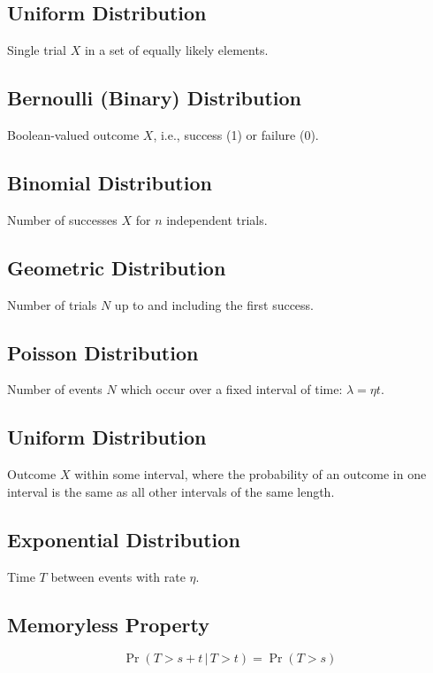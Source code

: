 \documentclass{article}
\begin{document}
\begin{multicols}{3}
    \subsection{Uniform Distribution}
    Single trial \(X\) in a set of equally likely elements.
    \subsection{Bernoulli (Binary) Distribution}
    Boolean-valued outcome \(X\), i.e., success (1) or failure (0).
    \subsection{Binomial Distribution}
    Number of successes \(X\) for \(n\) independent trials.
    \subsection{Geometric Distribution}
    Number of trials \(N\) up to and including the first success.
    \subsection{Poisson Distribution}
    Number of events \(N\) which occur over a fixed interval of time: \(\lambda = \eta t\).
    \subsection{Uniform Distribution}
    Outcome \(X\) within some interval, where the probability of an outcome in one interval is the same as all other intervals of the same length.
    \subsection{Exponential Distribution}
    Time \(T\) between events with rate \(\eta\).
    \subsection{Memoryless Property}
    \begin{equation*}
        \Pr{\left( T > s + t \,\vert\, T > t \right)} = \Pr{\left( T > s \right)}
    \end{equation*}
    \endgroup
\end{multicols}
\end{document}
